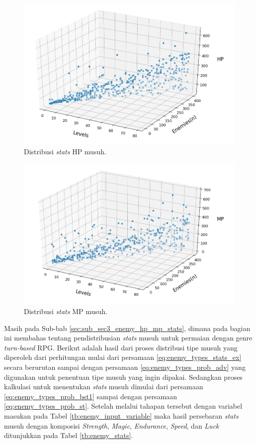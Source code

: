 \begin{figure} [!h] \centering
	\centering
	\includegraphics[scale=0.57]{img/EnemyHpDistrib.png}
	\caption{Distribusi \textit{stats} HP musuh.}
	\label{fig:enemy_hp_distrib}
\end{figure}

\begin{figure} [!h] \centering
	\centering
	\includegraphics[scale=0.57]{img/EnemyMpDistrib.png}
	\caption{Distribusi \textit{stats} MP musuh.}
	\label{fig:enemy_mp_distrib}
\end{figure}

Masih pada Sub-bab \ref{sec:sub_sec3_enemy_hp_mp_stats}, dimana pada bagian ini membahas tentang pendistribusian \textit{stats} musuh untuk permaian dengan genre \textit{turn-based} RPG. Berikut adalah hasil dari proses distribusi tipe musuh yang diperoleh dari perhitungan mulai dari persamaan \ref{eq:enemy_types_stats_ex} secara berurutan sampai dengan persamaan \ref{eq:enemy_types_prob_adv} yang digunakan untuk penentuan tipe musuh yang ingin dipakai. Sedangkan proses kalkulasi untuk menentukan \textit{stats} musuh dimulai dari persamaan \ref{eq:enemy_types_prob_bst1} sampai dengan persamaan \ref{eq:enemy_types_prob_st}. Setelah melalui tahapan tersebut dengan variabel masukan pada Tabel \ref{tb:enemy_input_variable} maka hasil persebaran \textit{stats} musuh dengan komposisi \textit{Strength}, \textit{Magic}, \textit{Endurance}, \textit{Speed}, dan \textit{Luck} ditunjukkan pada Tabel \ref{tb:enemy_stats}.
\vspace{-1ex}

